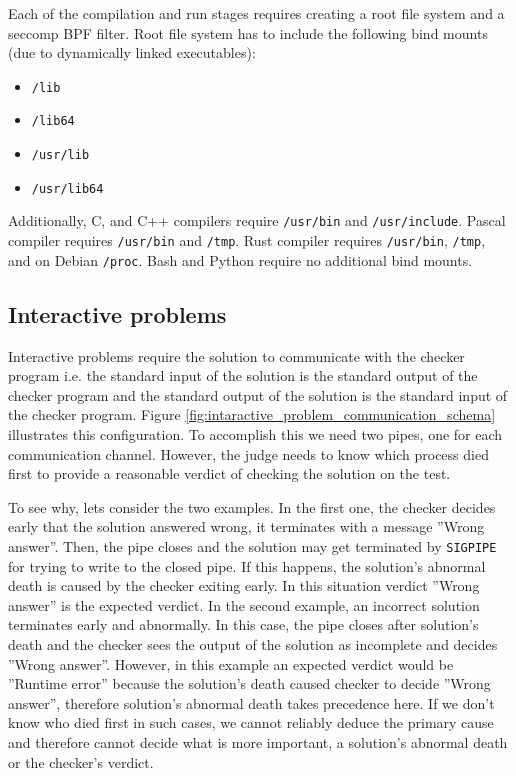 \documentclass[en]{pracamgr}
\begin{document}
Each of the compilation and run stages requires creating a root file system and a seccomp BPF filter. Root file system has to include the following bind mounts (due to dynamically linked executables):
\begin{itemize}
    \item \texttt{/lib}
    \item \texttt{/lib64}
    \item \texttt{/usr/lib}
    \item \texttt{/usr/lib64}
\end{itemize}

Additionally, C, and C++ compilers require \texttt{/usr/bin} and \texttt{/usr/include}.
Pascal compiler requires \texttt{/usr/bin} and \texttt{/tmp}.
Rust compiler requires \texttt{/usr/bin}, \texttt{/tmp}, and on Debian \texttt{/proc}.
Bash and Python require no additional bind mounts.

\subsection{Interactive problems}

Interactive problems require the solution to communicate with the checker program i.e. the standard input of the solution is the standard output of the checker program and the standard output of the solution is the standard input of the checker program. Figure \ref{fig:intaractive_problem_communication_schema} illustrates this configuration. To accomplish this we need two pipes, one for each communication channel. However, the judge needs to know which process died first to provide a reasonable verdict of checking the solution on the test.

To see why, lets consider the two examples. In the first one, the checker decides early that the solution answered wrong, it terminates with a message ''Wrong answer''. Then, the pipe closes and the solution may get terminated by \texttt{SIGPIPE} for trying to write to the closed pipe. If this happens, the solution's abnormal death is caused by the checker exiting early. In this situation verdict ''Wrong answer'' is the expected verdict. In the second example, an incorrect solution terminates early and abnormally. In this case, the pipe closes after solution's death and the checker sees the output of the solution as incomplete and decides ''Wrong answer''. However, in this example an expected verdict would be ''Runtime error'' because the solution's death caused checker to decide ''Wrong answer'', therefore solution's abnormal death takes precedence here. If we don't know who died first in such cases, we cannot reliably deduce the primary cause and therefore cannot decide what is more important, a solution's abnormal death or the checker's verdict.
\end{document}
